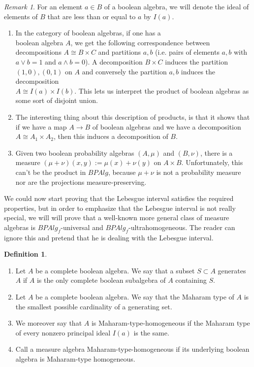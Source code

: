 \documentclass[a4paper]{amsproc}
\theoremstyle{plain}
\theoremstyle{definition}
\newtheorem{definition}[theorem]{Definition}
\theoremstyle{remark}
\newtheorem{remark}[theorem]{Remark}
\numberwithin{equation}{section}
\begin{document}
\begin{remark}\label{partitions}
For an element $a \in B$ of a boolean algebra, we will denote the ideal of elements of $B$ that are less than or equal to $a$ by $I(a)$.
\begin{enumerate}
\item In the category of boolean algebras, if one has a \\ boolean algebra $A$, we get the following correspondence between decompositions $A \cong B \times C$ and partitions $a,b$ (i.e. pairs of elements $a,b$ with $a \vee b = 1$ and $a \wedge b = 0$). A decomposition $B \times C$ induces the partition $(1,0), (0,1)$ on $A$ and conversely the partition $a,b$ induces the decomposition \\ $A \cong I(a) \times I(b)$. This lets us interpret the product of boolean algebras as some sort of disjoint union.
\item The interesting thing about this description of products, is that it shows that if we have a map $A \to B$ of boolean algebras and we have a decomposition $A \cong A_1 \times A_2$, then this induces a decomposition of $B$.
\item Given two boolean probability algebras $(A, \mu)$ and $(B, \nu)$, there is a measure $(\mu + \nu)(x,y) := \mu(x) + \nu(y)$ on $A \times B$. Unfortunately, this can't be the product in $BPAlg$, because $\mu + \nu$ is not a probability measure nor are the projections measure-preserving.
\end{enumerate}
\end{remark}

We could now start proving that the Lebesgue interval satisfies the required properties, but in order to emphasize that the Lebesgue interval is not really special, we will will prove that a well-known more general class of measure algebras is $BPAlg_f$-universal and $BPAlg_f$-ultrahomogeneous. The reader can ignore this and pretend that he is dealing with the Lebesgue interval.

\begin{definition} \label{maharam_type_homogeneous}
\begin{enumerate}
\item Let $A$ be a complete boolean algebra. We say that a subset $S \subset A$ generates $A$ if $A$ is the only complete boolean subalgebra of $A$ containing $S$.
\item Let $A$ be a complete boolean algebra. We say that the Maharam type of $A$ is the smallest possible cardinality of a generating set.
\item We moreover say that $A$ is Maharam-type-homogeneous if the Maharam type of every nonzero principal ideal $I(a)$ is the same.
\item Call a measure algebra Maharam-type-homogeneous if its underlying boolean algebra is Maharam-type homogeneous.
\end{enumerate}
\end{definition}
\end{document}
